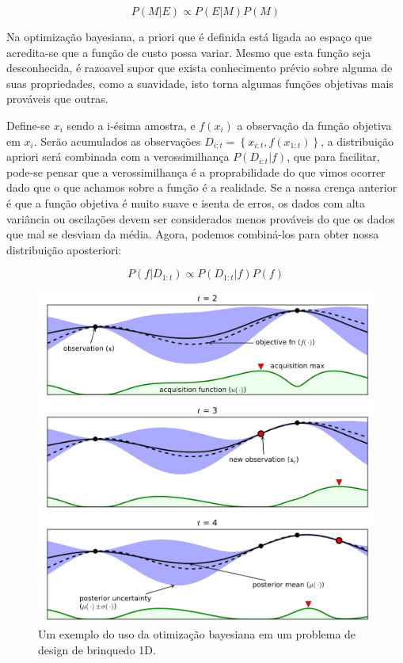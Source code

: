 \documentclass[
	12pt,				%
	a4paper,		%
	oneside,    %
	chapter=TITLE,		   %
	section=TITLE,		   %
	subsection=TITLE,	   %
	subsubsection=TITLE, %
	english,			%
	french,				%
	spanish,			%
	brazil,				%
]{abntex2}
\begin{document}
\[
P(M|E) \propto P(E|M)P(M)
\]

Na optimização bayesiana, a priori que é definida está ligada ao espaço
que acredita-se que a função de custo possa variar. Mesmo que esta
função seja desconhecida, é razoavel supor que exista conhecimento
prévio sobre alguma de suas propriedades, como a suavidade, isto torna
algumas funções objetivas mais prováveis que outras.

Define-se \(x_i\) sendo a i-ésima amostra, e \(f(x_i)\) a observação da
função objetiva em \(x_i\). Serão acumulados as observações
\(D_{i:t}=\left\{ x_{i:t},f(x_{1:t}) \right\}\), a distribuição apriori
será combinada com a verossimilhança \(P(D_{i:t}|f)\), que para
facilitar, pode-se pensar que a verossimilhança é a proprabilidade do
que vimos ocorrer dado que o que achamos sobre a função é a realidade.
Se a nossa crença anterior é que a função objetiva é muito suave e
isenta de erros, os dados com alta variância ou oscilações devem ser
considerados menos prováveis do que os dados que mal se desviam da
média. Agora, podemos combiná-los para obter nossa distribuição
aposteriori:

\[
P(f|D_{1:t}) \propto P(D_{1:t}|f)P(f)
\]

\begin{figure}
\centering
\includegraphics[width=\textwidth,height=0.6\textheight]{fig/bo.png}
\caption{Um exemplo do uso da otimização bayesiana em um problema de
design de brinquedo 1D.\label{bo}}
\end{figure}
\end{document}
